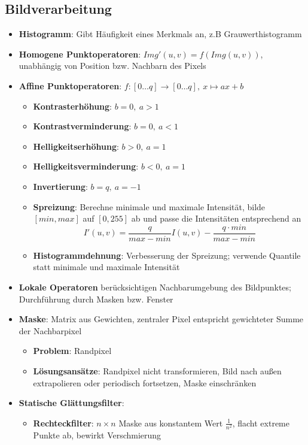 \subsection{Bildverarbeitung}%
\label{bild:sub:bildverarbeitung}

\begin{itemize}
	\item \textbf{Histogramm}: Gibt Häufigkeit eines Merkmals an, z.B Grauwerthistogramm
	\item \textbf{Homogene Punktoperatoren}: $Img'(u, v) = f(Img(u, v))$, unabhängig von Position bzw. Nachbarn des Pixels
	\newpage
	\item \textbf{Affine Punktoperatoren}: $f: [0\dots q] \rightarrow [0\dots q],\ x \mapsto ax + b$
	\begin{itemize}
		\item \textbf{Kontrasterhöhung}: $b = 0,\ a > 1$
		\item \textbf{Kontrastverminderung}: $b = 0,\ a < 1$
		\item \textbf{Helligkeitserhöhung}: $b > 0,\ a = 1$
		\item \textbf{Helligkeitsverminderung}: $b < 0,\ a = 1$
		\item \textbf{Invertierung}: $b = q,\ a = -1$
		\item \textbf{Spreizung}: Berechne minimale und maximale Intensität, bilde $[min, max]$ auf $[0, 255]$ ab und passe die Intensitäten entsprechend an
		$$
			I'(u, v) = \frac{q}{max - min}I(u, v) - \frac{q \cdot min}{max - min}
		$$
		\item \textbf{Histogrammdehnung}: Verbesserung der Spreizung; verwende Quantile statt minimale und maximale Intensität
	\end{itemize}
	\item \textbf{Lokale Operatoren} berücksichtigen Nachbarumgebung des Bildpunktes; Durchführung durch Masken bzw. Fenster
	\item \textbf{Maske}: Matrix aus Gewichten, zentraler Pixel entspricht gewichteter Summe der Nachbarpixel
	\begin{itemize}
		\item \textbf{Problem}: Randpixel
		\item \textbf{Lösungsansätze}: Randpixel nicht transformieren, Bild nach außen extrapolieren oder periodisch fortsetzen, Maske einschränken
	\end{itemize}
	\item \textbf{Statische Glättungsfilter}:
	\begin{itemize}
		\item \textbf{Rechteckfilter}: $n\times n$ Maske aus konstantem Wert $\frac{1}{n^2}$, flacht extreme Punkte ab, bewirkt Verschmierung

\end{itemize}
\end{itemize}
